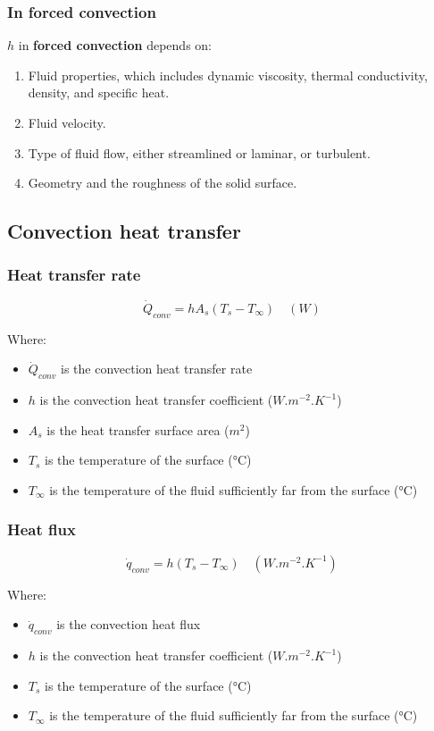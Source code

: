 \documentclass[11pt]{article}
\begin{document}
\subsubsection{In forced convection}
\label{sec:org58b32e4}
\(h\) in \textbf{forced convection} depends on:
\begin{enumerate}
\item Fluid properties, which includes dynamic viscosity, thermal conductivity, density, and specific heat.
\item Fluid velocity.
\item Type of fluid flow, either streamlined or laminar, or turbulent.
\item Geometry and the roughness of the solid surface.
\end{enumerate}
\subsection{Convection heat transfer}
\label{sec:org68fdca4}

\subsubsection{Heat transfer rate}
\label{sec:org8b9986d}
\[\dot{Q}_{conv} = h A_s (T_s - T_{\infty}) \quad (\unit{W})\]

Where:
\begin{itemize}
\item \(\dot{Q}_{conv}\) is the convection heat transfer rate
\item \(h\) is the convection heat transfer coefficient (\(\unit{W.m^{-2}.K^{-1}}\))
\item \(A_s\) is the heat transfer surface area (\(\unit{m^{2}}\))
\item \(T_s\) is the temperature of the surface (\(\unit{\degreeCelsius}\))
\item \(T_{\infty}\) is the temperature of the fluid sufficiently far from the surface (\(\unit{\degreeCelsius}\))
\end{itemize}
\subsubsection{Heat flux}
\label{sec:org5e2754a}
\[\dot{q}_{conv} = h (T_s - T_{\infty}) \quad (\unit{W.m^{-2}.K^{-1}})\]

Where:
\begin{itemize}
\item \(\dot{q}_{conv}\) is the convection heat flux
\item \(h\) is the convection heat transfer coefficient (\(\unit{W.m^{-2}.K^{-1}}\))
\item \(T_s\) is the temperature of the surface (\(\unit{\degreeCelsius}\))
\item \(T_{\infty}\) is the temperature of the fluid sufficiently far from the surface (\(\unit{\degreeCelsius}\))
\end{itemize}
\end{document}
